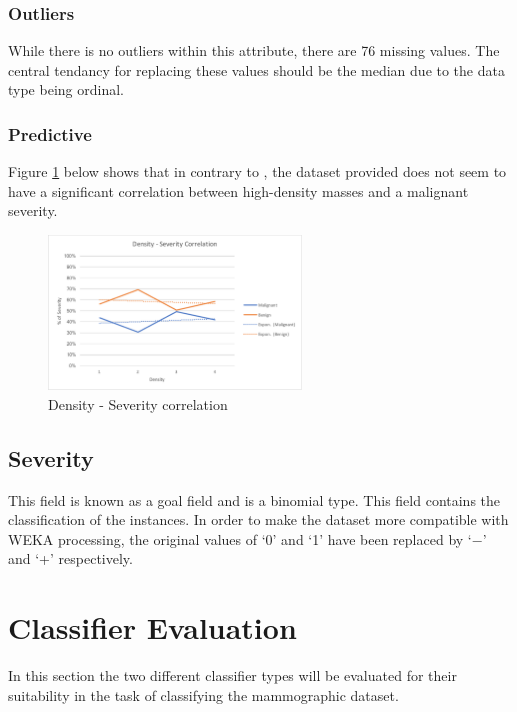 \documentclass[12pt]{article}
\begin{document}
      \subsubsection{Outliers}
        While there is no outliers within this attribute, there are 76 missing values. The central tendancy for replacing these values should be the median due to the data type being ordinal.

      \subsubsection{Predictive}
        Figure \ref{fig:density-severity-correlation} below shows that in contrary to \cite{woods2011mammographic}, the dataset provided does not seem to have a significant correlation between high-density masses and a malignant severity.


        \begin{figure}[H]
          \centering
          \includegraphics[width=0.6\textwidth]{density-severity-correlation}
          \caption{Density - Severity correlation}
          \label{fig:density-severity-correlation}
        \end{figure}

    \subsection{Severity}
      This field is known as a goal field and is a binomial type. This field contains the classification of the instances. In order to make the dataset more compatible with WEKA processing, the original values of ‘0’ and ‘1’ have been replaced by ‘$-$’ and ‘+’ respectively.

\section{Classifier Evaluation}
  In this section the two different classifier types will be evaluated for their suitability in the task of classifying the mammographic dataset.
\end{document}
